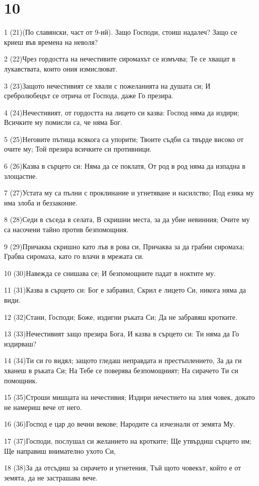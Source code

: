 \chapter{10}

\par 1 (21)(По славянски, част от 9-ий). Защо Господи, стоиш надалеч? Защо се криеш във времена на неволя?
\par 2 (22)Чрез гордостта на нечестивите сиромахът се измъчва; Те се хващат в лукавствата, които ония измислюват.
\par 3 (23)Защото нечестивият се хвали с пожеланията на душата си; И сребролюбецът се отрича от Господа, даже Го презира.
\par 4 (24)Нечестивият, от гордостта на лицето си казва: Господ няма да издири; Всичките му помисли са, че няма Бог.
\par 5 (25)Неговите пътища всякога са упорити; Твоите съдби са твърде високо от очите му; Той презира всичките си противници.
\par 6 (26)Казва в сърцето си: Няма да се поклатя, От род в род няма да изпадна в злощастие.
\par 7 (27)Устата му са пълни с проклинание и угнетяване и насилство; Под езика му има злоба и беззаконие.
\par 8 (28)Седи в съседа в селата, В скришни места, за да убие невинния; Очите му са насочени тайно против безпомощния.
\par 9 (29)Причаква скришно като лъв в рова си, Причаква за да грабни сиромаха; Грабва сиромаха, като го влачи в мрежата си.
\par 10 (30)Навежда се снишава се; И безпомощните падат в ноктите му.
\par 11 (31)Казва в сърцето си: Бог е забравил, Скрил е лицето Си, никога няма да види.
\par 12 (32)Стани, Господи; Боже, издигни ръката Си; Да не забравяш кротките.
\par 13 (33)Нечестивият защо презира Бога, И казва в сърцето си: Ти няма да Го издирваш?
\par 14 (34)Ти си го видял; защото гледаш неправдата и престъплението, За да ги хванеш в ръката Си; На Тебе се поверява безпомощният; На сирачето Ти си помощник.
\par 15 (35)Строши мишцата на нечестивия; Издири нечестието на злия човек, докато не намериш вече от него.
\par 16 (36)Господ е цар до вечни векове; Народите са изчезнали от земята Му.
\par 17 (37)Господи, послушал си желанието на кротките; Ще утвърдиш сърцето им; Ще направиш внимателно ухото Си,
\par 18 (38)За да отсъдиш за сирачето и угнетения, Тъй щото човекът, който е от земята, да не застрашава вече.

